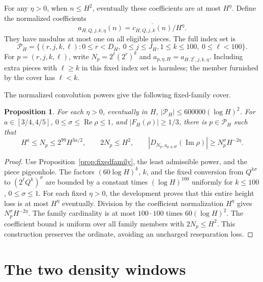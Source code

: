 \documentclass[11pt,a4paper,oneside]{article}
\newtheorem{proposition}[theorem]{Proposition}
\theoremstyle{definition}
\newcommand{\Rea}{\operatorname{Re}}
\newcommand{\Ima}{\operatorname{Im}}
\numberwithin{equation}{section}
\begin{document}
For any $\eta>0$, when $n\le H^2$, eventually these coefficients are
at most $H^\eta$. Define the normalized coefficients
\[
 a_{H,Q,j,k,\eta}(n)=\overline{c_{H,Q,j,k}(n)}/H^\eta.
\]
They have modulus at most one on all eligible pieces.
The full index set is
\[
 \mathcal P_H=\{(r,j,k,\ell):0\le r<D_H,\ 0\le j\le J_H,
                                  1\le k\le100,\ 0\le\ell<100\}.
\]
For $p=(r,j,k,\ell)$, write $N_p=2^\ell(2^r)^k$ and $a_{p,\eta,H}=a_{H,2^r,j,k,\eta}$. Including extra pieces with $\ell\ge k$ in this fixed
index set is harmless; the member furnished by the cover has $\ell<k$.

The normalized convolution powers give the following fixed-family cover.
\begin{proposition}\label{prop:poweredcover}
For each $\eta>0$, eventually in $H$, $|\mathcal P_H|\le600000(\log H)^2$.
For $a\in[3/4,4/5]$, $0\le\sigma\le\Rea\rho\le1$, and
$|F_H(\rho)|\ge1/3$, there is $p\in\mathcal P_H$ such that
\[
 H^a\le N_p\le2^{99}H^{3a/2},\qquad2N_p\le H^2,
 \qquad |D_{N_p,a_{p,\eta,H}}(\Ima\rho)|\ge N_p^\sigma H^{-2\eta}.
\]
\end{proposition}
\begin{proof}
Use Proposition~\ref{prop:fixedfamily}, the least admissible power, and the
piece pigeonhole. The factors $(60\log H)^k$, $k$, and the fixed conversion
from $Q^{k\sigma}$ to $(2^\ell Q^k)^\sigma$ are bounded by a constant
times $(\log H)^{100}$ uniformly for $k\le100$, $0\le\sigma\le1$.
For each fixed $\eta>0$, the development proves that this entire height loss is
at most $H^\eta$ eventually. Division by the coefficient normalization
$H^\eta$ gives $N_p^\sigma H^{-2\eta}$. The family cardinality is at most
$100\cdot100$ times $60(\log H)^2$. The coefficient bound is uniform over
all family members with $2N_p\le H^2$. This construction preserves the
ordinate, avoiding an uncharged reseparation loss.
\end{proof}
\section{The two density windows}\label{ch:windows}
\end{document}
